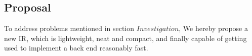 \documentclass[a1,portrait]{a1poster}
\begin{document}
\begin{multicols}{2}




\section*{Proposal}

To address problems mentioned in section $Investigation$, We hereby propose a new IR,
which is lightweight, neat and compact, and finally capable of getting used to implement a back end reasonably fast.


\vspace{-1.5cm}
\begin{multicols}{2}


\end{multicols}
\end{multicols}
\end{document}
